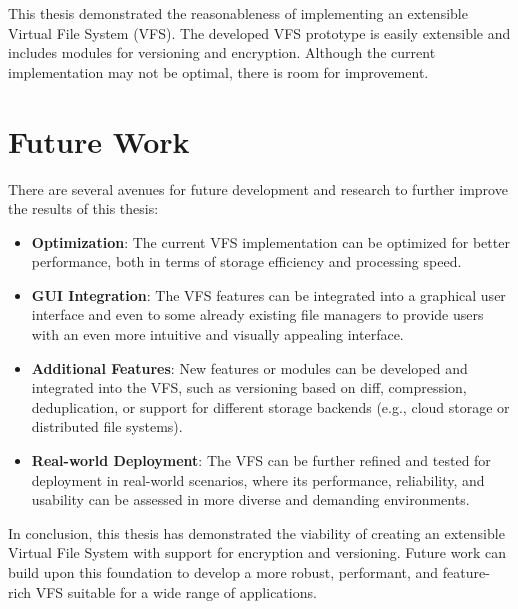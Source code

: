 
This thesis demonstrated the reasonableness of implementing an extensible Virtual File System (VFS).
The developed VFS prototype is easily extensible and includes modules for versioning and encryption.
Although the current implementation may not be optimal, there is room for improvement.


\section{Future Work}\label{sec:future-work}

There are several avenues for future development and research to further improve the results of this thesis:

\begin{itemize}
    \item \textbf{Optimization}: The current VFS implementation can be optimized for better performance, both in terms of storage efficiency and processing speed.
    \item \textbf{GUI Integration}: The VFS features can be integrated into a graphical user interface and even to some already existing file managers to provide users with an even more intuitive and visually appealing interface.
    \item \textbf{Additional Features}: New features or modules can be developed and integrated into the VFS, such as versioning based on diff, compression, deduplication, or support for different storage backends (e.g., cloud storage or distributed file systems).
    \item \textbf{Real-world Deployment}: The VFS can be further refined and tested for deployment in real-world scenarios, where its performance, reliability, and usability can be assessed in more diverse and demanding environments.
\end{itemize}

In conclusion, this thesis has demonstrated the viability of creating an extensible Virtual File System with support for encryption and versioning.
Future work can build upon this foundation to develop a more robust, performant, and feature-rich VFS suitable for a wide range of applications.